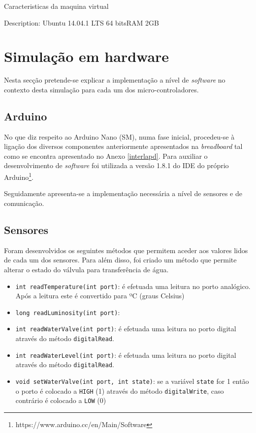 Caracteristicas da maquina virtual

Description:	Ubuntu 14.04.1 LTS
64 bitsRAM 2GB 






\newpage
\section{Simulação em hardware}

Nesta secção pretende-se explicar a implementação a nível de \textit{software} no contexto desta simulação para cada um dos micro-controladores. 


\subsection{Arduino}

No que diz respeito ao Arduino Nano (\ac{SM}), numa fase inicial,  procedeu-se à ligação dos diversos componentes anteriormente apresentados na \textit{breadboard} tal como se encontra apresentado no Anexo \ref{interlapd}. Para auxiliar o desenvolvimento de \textit{software} foi utilizada a versão 1.8.1 do \ac{IDE} do próprio Arduino\footnote{https://www.arduino.cc/en/Main/Software}.  

Seguidamente apresenta-se a implementação necessária a nível de sensores e de comunicação. 

\subsection{Sensores}



Foram desenvolvidos os seguintes métodos que permitem aceder aos valores lidos de cada um dos sensores. Para além disso, foi criado um método que permite alterar o estado do válvula para transferência de água. 

\begin{itemize}
	\item \texttt{int readTemperature(int port)}: é efetuada uma leitura no porto analógico. Após a leitura este é convertido para ºC (graus Celsius)
	
	\item \texttt{long readLuminosity(int port)}: 
	
	\item \texttt{int readWaterValve(int port)}: é efetuada uma leitura no porto digital através do método \texttt{digitalRead}. 
	
	\item \texttt{int readWaterLevel(int port)}: é efetuada uma leitura no porto digital através do método \texttt{digitalRead}.
	
	
	\item \texttt{void setWaterValve(int port, int state)}: se a variável \texttt{state} for 1 então o porto é colocado a \texttt{HIGH} (1) através do método \texttt{digitalWrite}, caso contrário é colocado a \texttt{LOW} (0)
	
\end{itemize}

